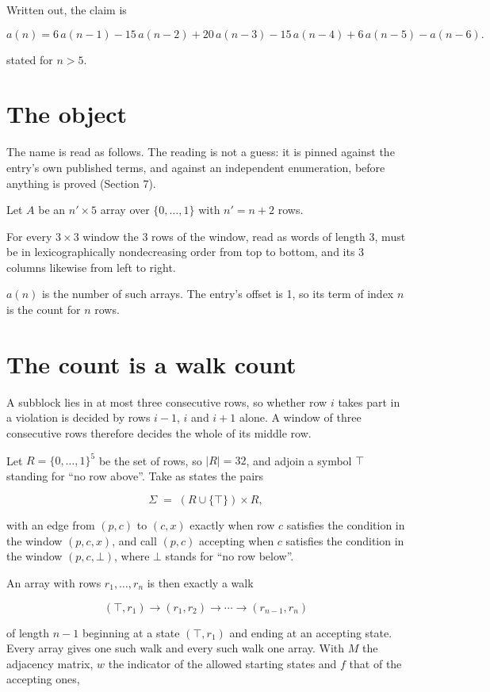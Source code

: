 \documentclass[11pt]{article}
\theoremstyle{definition}
\begin{document}
Written out, the claim is

\[a(n) = 6\,a(n-1) - 15\,a(n-2) + 20\,a(n-3) - 15\,a(n-4) + 6\,a(n-5) - a(n-6).\]

stated for $n > 5$.

\section{The object}

The name is read as follows. The reading is not a guess: it is pinned against the entry's own published terms, and against an independent enumeration, before anything is proved (Section 7).

Let $A$ be an $n' \times 5$ array over $\{0,\dots,1\}$ with $n' = n + 2$ rows.

For every $3\times3$ window the $3$ rows of the window, read as words of length $3$, must be in lexicographically nondecreasing order from top to bottom, and its $3$ columns likewise from left to right.

$a(n)$ is the number of such arrays. The entry's offset is 1, so its term of index $n$ is the count for $n$ rows.

\section{The count is a walk count}

A subblock lies in at most three consecutive rows, so whether row $i$ takes part in a violation is decided by rows $i-1$, $i$ and $i+1$ alone. A window of three consecutive rows therefore decides the whole of its middle row.

Let $R = \{0,\dots,1\}^{5}$ be the set of rows, so $|R| = 32$, and adjoin a symbol $\top$ standing for ``no row above''. Take as states the pairs

\[\Sigma \;=\; (R \cup \{\top\}) \times R,\]

with an edge from $(p,c)$ to $(c,x)$ exactly when row $c$ satisfies the condition in the window $(p,c,x)$, and call $(p,c)$ accepting when $c$ satisfies the condition in the window $(p,c,\bot)$, where $\bot$ stands for ``no row below''.

An array with rows $r_1,\dots,r_n$ is then exactly a walk

\[(\top,r_1) \to (r_1,r_2) \to \cdots \to (r_{n-1},r_n)\]

of length $n-1$ beginning at a state $(\top,r_1)$ and ending at an accepting state. Every array gives one such walk and every such walk one array. With $M$ the adjacency matrix, $w$ the indicator of the allowed starting states and $f$ that of the accepting ones,
\end{document}

